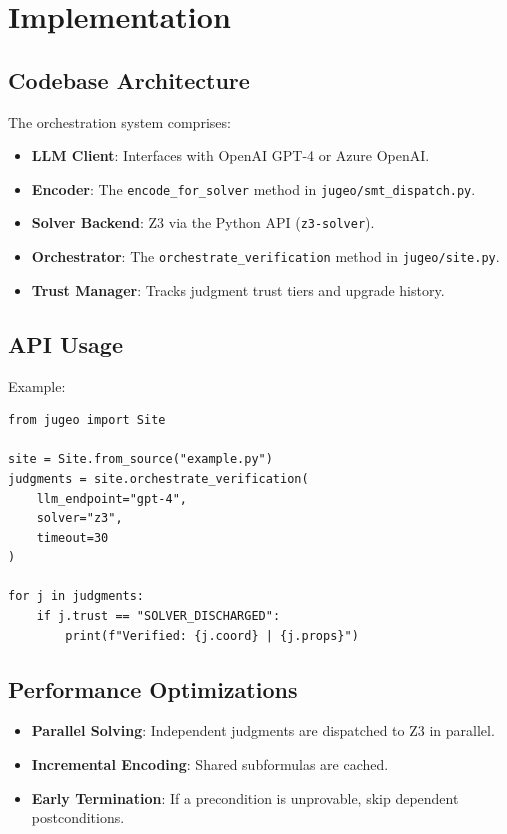 \documentclass[11pt]{article}
\begin{document}
\section{Implementation}\label{sec:implementation}

\subsection{Codebase Architecture}
The orchestration system comprises:
\begin{itemize}[noitemsep]
  \item \textbf{LLM Client}: Interfaces with OpenAI GPT-4 or Azure OpenAI.
  \item \textbf{Encoder}: The \texttt{encode\_for\_solver} method in 
        \texttt{jugeo/smt\_dispatch.py}.
  \item \textbf{Solver Backend}: Z3 via the Python API (\texttt{z3-solver}).
  \item \textbf{Orchestrator}: The \texttt{orchestrate\_verification} method 
        in \texttt{jugeo/site.py}.
  \item \textbf{Trust Manager}: Tracks judgment trust tiers and upgrade history.
\end{itemize}

\subsection{API Usage}
Example:
\begin{lstlisting}[style=jugeo-python]
from jugeo import Site

site = Site.from_source("example.py")
judgments = site.orchestrate_verification(
    llm_endpoint="gpt-4",
    solver="z3",
    timeout=30
)

for j in judgments:
    if j.trust == "SOLVER_DISCHARGED":
        print(f"Verified: {j.coord} | {j.props}")
\end{lstlisting}

\subsection{Performance Optimizations}
\begin{itemize}[noitemsep]
  \item \textbf{Parallel Solving}: Independent judgments are dispatched to Z3 
        in parallel.
  \item \textbf{Incremental Encoding}: Shared subformulas are cached.
  \item \textbf{Early Termination}: If a precondition is unprovable, skip 
        dependent postconditions.
\end{itemize}
\end{document}
